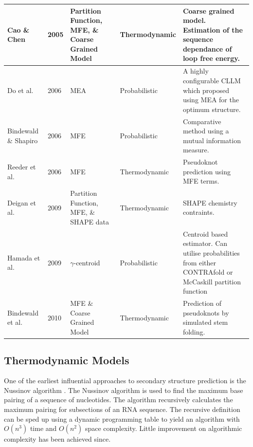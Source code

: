 \documentclass[journal]{IEEEtran}
\begin{document}
\begin{table}[t]
\begin{tabular}{|l|l|p{5cm}|l|p{5cm}|}
Cao \& Chen \cite{cao2005predicting} & 2005  & Partition Function, MFE, \& Coarse Grained Model & Thermodynamic      & Coarse grained model. Estimation of the sequence dependance of loop free energy. \\ \hline

Do et al. \cite{do2006contrafold} & 2006 & MEA & Probabilistic & A highly configurable CLLM which proposed using MEA for the optimum structure. \\ \hline

Bindewald \& Shapiro \cite{bindewald2006rna} & 2006 & MFE & Probabilistic & Comparative method using a mutual information measure. \\ \hline

Reeder et al. \cite{reeder2007pknotsrg} & 2006 & MFE & Thermodynamic & Pseudoknot prediction using MFE terms. \\ \hline

Deigan et al. \cite{deigan2009accurate} & 2009          & Partition Function, MFE, \& SHAPE data & Thermodynamic      & SHAPE chemistry contraints. \\ \hline

Hamada et al. \cite{hamada2009prediction, sato2009centroidfold} & 2009 & $\gamma$-centroid & Probabilistic & Centroid based estimator. Can utilise probabilities from either CONTRAfold or McCaskill partition function \\ \hline

Bindewald et al. \cite{bindewald2010cylofold} & 2010 & MFE \& Coarse Grained Model & Thermodynamic & Prediction of pseudoknots by simulated stem folding. \\ \hline

\end{tabular}
\end{table}

\subsection{Thermodynamic Models}
\label{subsec:thermodynamic-models}

One of the earliest influential approaches to secondary structure prediction is the Nussinov algorithm \cite{nussinov1980fast}. The Nussinov algorithm is used to find the maximum base pairing of a sequence of nucleotides. The algorithm recursively calculates the maximum pairing for subsections of an RNA sequence. The recursive definition can be sped up using a dynamic programming table to yield an algorithm with $O(n^3)$ time and $O(n^2)$ space complexity. Little improvement on algorithmic complexity has been achieved since. 
\end{document}
